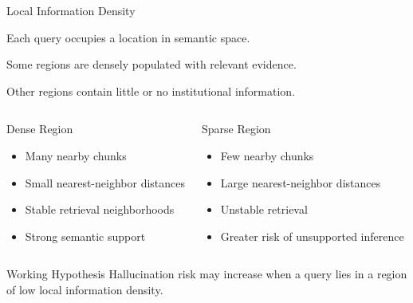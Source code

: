 \documentclass[aspectratio=169]{beamer}
\begin{document}

\begin{frame}{Local Information Density}

Each query occupies a location in semantic space.

\vspace{0.4cm}

Some regions are densely populated with relevant evidence.

Other regions contain little or no institutional information.

\vspace{0.2cm}

\begin{columns}[T]


\begin{block}{Dense Region}

\begin{itemize}
\item Many nearby chunks
\item Small nearest-neighbor distances
\item Stable retrieval neighborhoods
\item Strong semantic support
\end{itemize}

\end{block}


\begin{block}{Sparse Region}

\begin{itemize}
\item Few nearby chunks
\item Large nearest-neighbor distances
\item Unstable retrieval
\item Greater risk of unsupported inference
\end{itemize}

\end{block}

\end{columns}

\vspace{0.45cm}

\begin{alertblock}{Working Hypothesis}
Hallucination risk may increase when a query lies in a region of low
local information density.
\end{alertblock}

\end{frame}
\end{document}
